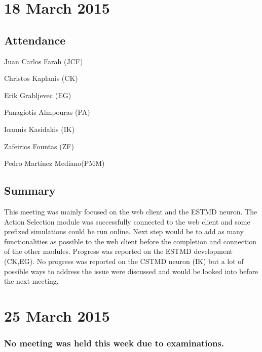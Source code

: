 \documentclass[a4paper,11pt]{article}
\begin{document}
\maketitle
\section*{18 March 2015}
\subsection*{Attendance}
\begin{compactenum}
\item Juan Carlos Farah (JCF)
\item Christos Kaplanis (CK)
\item Erik Grabljevec (EG)
\item Panagiotis Almpouras (PA)
\item Ioannis Kasidakis (IK)
\item Zafeirios Fountas (ZF)
\item Pedro Martínez Mediano(PMM)
\end{compactenum}

\subsection*{Summary}
This meeting was mainly focused on the web client and the ESTMD neuron. The Action Selection module was successfully connected to the web client and some prefixed simulations could be run online. Next step would be to add as many functionalities as possible to the web client before the completion and connection of the other modules. Progress was reported on the ESTMD development (CK,EG). No progress was reported on the CSTMD neuron (IK) but a lot of possible ways to address the issue were discussed and would be looked into before the next meeting.

\maketitle
\section*{25 March 2015}
\subsubsection*{No meeting was held this week due to examinations.}

\maketitle
\end{document}
